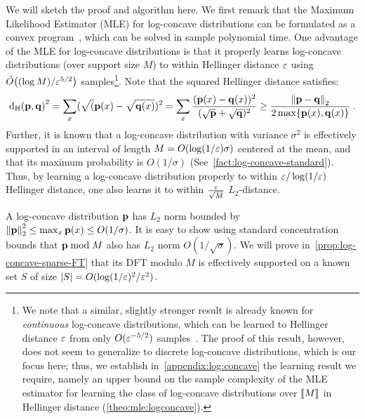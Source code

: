 We will sketch the proof and algorithm here. We first remark that the Maximum Likelihood Estimator (MLE) for log-concave distributions can be formulated as a convex program~\cite{DR:11}, 
which can be solved in sample polynomial time. One advantage of the MLE for log-concave distributions is that it properly learns log-concave distributions (over support size $M$) 
to within Hellinger distance $\varepsilon$ using $\tildeO{(\log M)/\eps^{5/2}}$ samples\footnote{We note that a similar, slightly stronger result is already known for \emph{continuous} log-concave distributions, which can be learned to Hellinger distance $\varepsilon$ from only $O(\varepsilon^{-5/2})$ samples~\cite{KS:16}. The proof of this result, however, does not seem to generalize to discrete log-concave distributions, which is our focus here; thus, we establish in~\cref{appendix:log:concave} the learning result we require, namely an upper bound on the sample complexity of the MLE estimator for learning the class of log-concave distributions over $\llbracket M\rrbracket$ in Hellinger distance (\cref{theo:mle:logconcave}).}. Note that the squared Hellinger distance satisfies:
\[
{\operatorname{d_{\rm{H}}}\!\left({\mathbf{p}, \mathbf{q}}\right)}^2 = \sum_x (\sqrt(\mathbf{p}(x)-\sqrt{\mathbf{q}(x)})^2 = \sum_x \frac{(\mathbf{p}(x)-\mathbf{q}(x))^2}{(\sqrt{\mathbf{p}} +\sqrt{\mathbf{q}})^2} \geq \frac{{\lVert\mathbf{p}-\mathbf{q}{\rVert}}_2}{2\max\{\mathbf{p}(x),\mathbf{q}(x)\}} \;.
\]
Further, it is known that a log-concave distribution with variance $\sigma^2$ is effectively supported in an interval of length $M=O(\log(1/\varepsilon) \sigma)$ centered at the mean, 
and that its maximum probability is $O(1/\sigma)$ (See~\cref{fact:log-concave-standard}). Thus, by learning a log-concave distribution properly to within $\varepsilon/\log(1/\varepsilon)$ Hellinger distance, one also learns it to within $\frac{\varepsilon}{\sqrt{M}}$ $L_2$-distance.

A log-concave distribution $\mathbf{p}$ has $L_2$ norm bounded by ${\lVert\mathbf{p}{\rVert}}_2^2 \leq \max_x \mathbf{p}(x) \leq O(1/\sigma)$. 
It is easy to show using standard concentration bounds that $\mathbf{p} \bmod M$ also has $L_2$ norm $O(1/\sqrt{\sigma})$. 
We will prove in~\cref{prop:log-concave-sparse-FT} that its DFT modulo $M$ is effectively 
supported on a known set $S$ of size $|S|=O(\log(1/\varepsilon)^2/\varepsilon^2)$.

